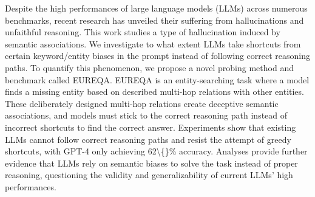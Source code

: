 Despite the high performances of large language models (LLMs) across numerous benchmarks, recent research has unveiled their suffering from hallucinations and unfaithful reasoning. This work studies a type of hallucination induced by semantic associations. We investigate to what extent LLMs take shortcuts from certain keyword/entity biases in the prompt instead of following correct reasoning paths. To quantify this phenomenon, we propose a novel probing method and benchmark called EUREQA. EUREQA is an entity-searching task where a model finds a missing entity based on described multi-hop relations with other entities. These deliberately designed multi-hop relations create deceptive semantic associations, and models must stick to the correct reasoning path instead of incorrect shortcuts to find the correct answer. Experiments show that existing LLMs cannot follow correct reasoning paths and resist the attempt of greedy shortcuts, with GPT-4 only achieving 62\textbackslash\{\}\% accuracy. Analyses provide further evidence that LLMs rely on semantic biases to solve the task  instead of proper reasoning, questioning the validity and generalizability of current LLMs' high performances.